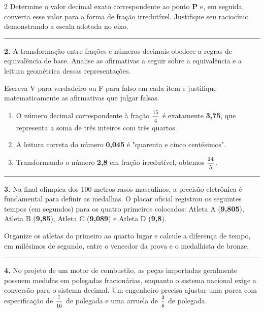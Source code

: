 \documentclass[twoside, 10pt, a4paper]{article}
\newlength{\espacoPreQuestao}
\newlength{\espacoQuestao}
\begin{document}
\begin{multicols*}{2}
Determine o valor decimal exato correspondente ao ponto \textbf{P} e, em seguida, converta esse valor para a forma de fração irredutível. Justifique seu raciocínio demonstrando a escala adotada no eixo.
\par\vspace{\espacoQuestao}

\noindent\textcolor{CorLinha}{\rule{\linewidth}{0.5pt}} 
\par\vspace{\espacoPreQuestao}
\textbf{2.} A transformação entre frações e números decimais obedece a regras de equivalência de base. Analise as afirmativas a seguir sobre a equivalência e a leitura geométrica dessas representações.

Escreva V para verdadeiro ou F para falso em cada item e justifique matematicamente as afirmativas que julgar falsas.
\begin{enumerate}[label=\Roman*.]
    \item O número decimal correspondente à fração $ \mfrac{15}{4} $ é exatamente \textbf{3,75}, que representa a soma de três inteiros com três quartos.
    \item A leitura correta do número \textbf{0,045} é "quarenta e cinco centésimos".
    \item Transformando o número \textbf{2,8} em fração irredutível, obtemos $ \mfrac{14}{5} $.
\end{enumerate}
\par\vspace{\espacoQuestao}

\noindent\textcolor{CorLinha}{\rule{\linewidth}{0.5pt}} 
\par\vspace{\espacoPreQuestao}
\textbf{3.} Na final olímpica dos 100 metros rasos masculinos, a precisão eletrônica é fundamental para definir as medalhas. O placar oficial registrou os seguintes tempos (em segundos) para os quatro primeiros colocados: Atleta A (\textbf{9,805}), Atleta B (\textbf{9,85}), Atleta C (\textbf{9,089}) e Atleta D (\textbf{9,8}).

Organize os atletas do primeiro ao quarto lugar e calcule a diferença de tempo, em milésimos de segundo, entre o vencedor da prova e o medalhista de bronze.
\par\vspace{\espacoQuestao}

\noindent\textcolor{CorLinha}{\rule{\linewidth}{0.5pt}} 
\par\vspace{\espacoPreQuestao}
\textbf{4.} No projeto de um motor de combustão, as peças importadas geralmente possuem medidas em polegadas fracionárias, enquanto o sistema nacional exige a conversão para o sistema decimal. Um engenheiro precisa ajustar uma porca com especificação de $ \mfrac{7}{16} $ de polegada e uma arruela de $ \mfrac{3}{8} $ de polegada.


\end{multicols*}
\end{document}
